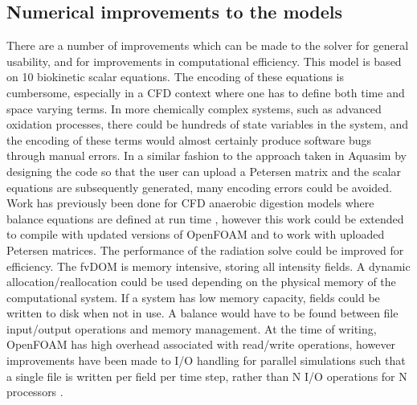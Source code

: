 \subsection{Numerical improvements to the models}
There are a number of improvements which can be made to the solver for general usability, and for improvements in computational efficiency. This model is based on 10 biokinetic scalar equations. The encoding of these equations is cumbersome, especially in a CFD context where one has to define both time and space varying terms. In more chemically complex systems, such as advanced oxidation processes, there could be hundreds of state variables in the system, and the encoding of these terms would almost certainly produce software bugs through manual errors. In a similar fashion to the approach taken in Aquasim \cite{reichert1994} by designing the code so that the user can upload a Petersen matrix and the scalar equations are subsequently generated, many encoding errors could be avoided. Work has previously been done for CFD anaerobic digestion models where balance equations are defined at run time \cite{gaden2013}, however this work could be extended to compile with updated versions of OpenFOAM and to work with uploaded Petersen matrices.
\skippingparagraph
The performance of the radiation solve could be improved for efficiency. The fvDOM is memory intensive, storing all intensity fields. A dynamic allocation/reallocation could be used depending on the physical memory of the computational system. If a system has low memory capacity, fields could be written to disk when not in use. A balance would have to be found between file input/output operations and memory management. At the time of writing, OpenFOAM has high overhead associated with read/write operations, however improvements have been made to I/O handling for parallel simulations such that a single file is written per field per time step, rather than N I/O operations for N processors \cite{theopenfoamfoundation2017}. 

